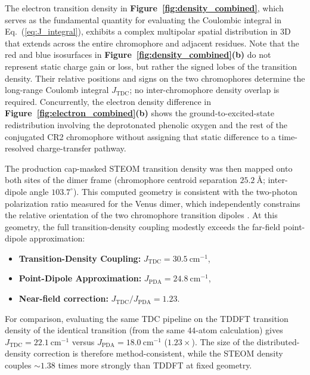 \documentclass[journal=jpcbfk, manuscript=article, layout=twocolumn, doi=true]{achemso}
\begin{document}
The electron transition density in \textbf{Figure~\ref{fig:density_combined}}, which serves as the fundamental quantity for evaluating the Coulombic integral in Eq.~(\ref{eq:J_integral}), exhibits a complex multipolar spatial distribution in 3D that extends across the entire chromophore and adjacent residues. Note that the red and blue isosurfaces in \textbf{Figure~\ref{fig:density_combined}(b)} do not represent static charge gain or loss, but rather the signed lobes of the transition density. Their relative positions and signs on the two chromophores determine the long-range Coulomb integral $J_{\text{TDC}}$; no inter-chromophore density overlap is required. Concurrently, the electron density difference in \textbf{Figure~\ref{fig:electron_combined}(b)} shows the ground-to-excited-state redistribution involving the deprotonated phenolic oxygen and the rest of the conjugated CR2 chromophore without assigning that static difference to a time-resolved charge-transfer pathway.

The production cap-masked STEOM transition density was then mapped onto both sites of the dimer frame (chromophore centroid separation $25.2~\text{\AA}$; inter-dipole angle $103.7^{\circ}$). This computed geometry is consistent with the two-photon polarization ratio measured for the Venus dimer, which independently constrains the relative orientation of the two chromophore transition dipoles \cite{cusick2026polarization}. At this geometry, the full transition-density coupling modestly exceeds the far-field point-dipole approximation:

{\sloppy\setlength{\leftmargini}{1em}
\begin{itemize}
    \item \textbf{Transition-Density Coupling:} $J_{\text{TDC}} = 30.5~\mathrm{cm^{-1}}$,
    \item \textbf{Point-Dipole Approximation:} $J_{\text{PDA}} = 24.8~\mathrm{cm^{-1}}$,
    \item \textbf{Near-field correction:} $J_{\text{TDC}}/J_{\text{PDA}} = 1.23$.
\end{itemize}}

\noindent For comparison, evaluating the same TDC pipeline on the TDDFT transition density of the identical transition (from the same $44$-atom calculation) gives $J_{\text{TDC}} = 22.1~\mathrm{cm^{-1}}$ versus $J_{\text{PDA}} = 18.0~\mathrm{cm^{-1}}$ ($1.23\times$). The size of the distributed-density correction is therefore method-consistent, while the STEOM density couples ${\sim}1.38$ times more strongly than TDDFT at fixed geometry.
\end{document}
